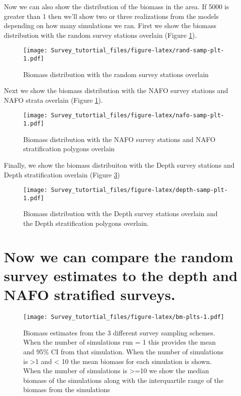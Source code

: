 \documentclass[
]{article}
\begin{document}
Now we can also show the distribution of the biomass in the area. If 5000 is greater than 1 then we'll show two or three realizations from the models depending on how many simulations we ran. First we show the biomass distribution with the random survey stations overlain (Figure \ref{fig:rand-samp-plt}).

\begin{figure}
\centering
\texttt{[image: Survey\_tutortial\_files/figure-latex/rand-samp-plt-1.pdf]}
\caption{\label{fig:rand-samp-plt}Biomass distribution with the random survey stations overlain}
\end{figure}

Next we show the biomass distribution with the NAFO survey stations and NAFO strata overlain (Figure \ref{fig:rand-samp-plt}).

\begin{figure}
\centering
\texttt{[image: Survey\_tutortial\_files/figure-latex/nafo-samp-plt-1.pdf]}
\caption{\label{fig:nafo-samp-plt}Biomass distribution with the NAFO survey stations and NAFO stratification polygons overlain}
\end{figure}

Finally, we show the biomass distribuiton with the Depth survey stations and Depth stratification overlain (Figure \ref{fig:depth-samp-plt})

\begin{figure}
\centering
\texttt{[image: Survey\_tutortial\_files/figure-latex/depth-samp-plt-1.pdf]}
\caption{\label{fig:depth-samp-plt}Biomass distribution with the Depth survey stations overlain and the Depth stratification polygons overlain.}
\end{figure}

\hypertarget{now-we-can-compare-the-random-survey-estimates-to-the-depth-and-nafo-stratified-surveys.}{%
\section{Now we can compare the random survey estimates to the depth and NAFO stratified surveys.}\label{now-we-can-compare-the-random-survey-estimates-to-the-depth-and-nafo-stratified-surveys.}}

\begin{figure}
\centering
\texttt{[image: Survey\_tutortial\_files/figure-latex/bm-plts-1.pdf]}
\caption{\label{fig:bm-plts}Biomass estimates from the 3 different survey sampling schemes. When the number of simulations run = 1 this provides the mean and 95\% CI from that simulation. When the number of simulations is \textgreater1 and \textless{} 10 the mean biomass for each simulation is shown. When the number of simulations is \textgreater=10 we show the median biomass of the simulations along with the interquartile range of the biomass from the simulations}
\end{figure}
\end{document}
